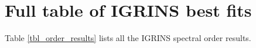 \documentclass[12pt]{report}
\newcommand{\name}{LkCa 4 }
\begin{document}
\section{Full table of IGRINS best fits}

Table \ref{tbl_order_results} lists all the IGRINS spectral order results.


%



\clearpage

%


\end{document}

